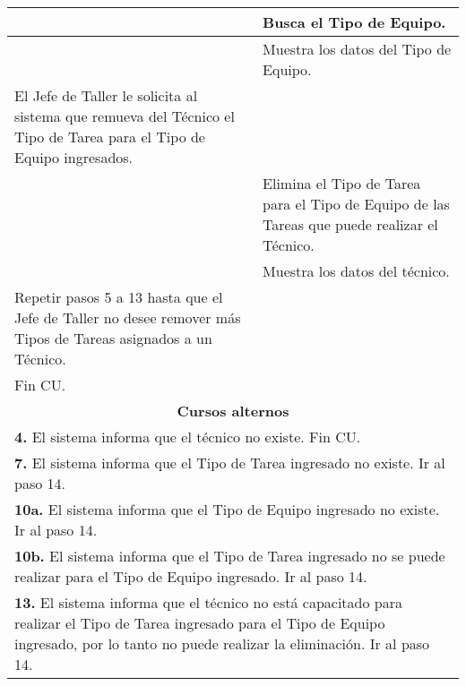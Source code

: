 \documentclass[12pt]{extarticle}
\begin{document}
\begin{longtable}{ |p{8cm}|p{8cm}| }
			& \inc Busca el Tipo de Equipo.\\
			\hline
			& \inc Muestra los datos del Tipo de Equipo.\\
			\hline
			\inc El Jefe de Taller le solicita al sistema que remueva del Técnico el Tipo de Tarea para el Tipo de Equipo ingresados. & \\
			\hline
			& \inc Elimina el Tipo de Tarea para el Tipo de Equipo de las Tareas que puede realizar el Técnico.\\
			\hline


			& \inc Muestra los datos del técnico.\\
			\hline
			\inc Repetir pasos 5 a 13 hasta que el Jefe de Taller no desee remover más Tipos de Tareas asignados a un Técnico.&\\
			\hline
			\inc Fin CU.& \\
		\hline
		\multicolumn{2}{|c|}{\textbf{Cursos alternos}}\\
		\hline
		\multicolumn{2}{|p{16cm}|}{\textbf{4. }El sistema informa que el técnico no existe. Fin CU.}\\
		\hline
		\multicolumn{2}{|p{16cm}|}{\textbf{7. }El sistema informa que el Tipo de Tarea ingresado no existe. Ir al paso 14.}\\
		\hline
		\multicolumn{2}{|p{16cm}|}{\textbf{10a. }El sistema informa que el Tipo de Equipo ingresado no existe. Ir al paso 14. }\\
		\hline
		\multicolumn{2}{|p{16cm}|}{\textbf{10b. }El sistema informa que el Tipo de Tarea ingresado no se puede realizar para el Tipo de Equipo ingresado. Ir al paso 14. }\\
		\hline
		\multicolumn{2}{|p{16cm}|}{\textbf{13. }El sistema informa que el técnico no está capacitado para realizar el Tipo de Tarea ingresado para el Tipo de Equipo ingresado, por lo tanto no puede realizar la eliminación. Ir al paso 14.}\\
		\hline
	\end{longtable}
\end{document}

